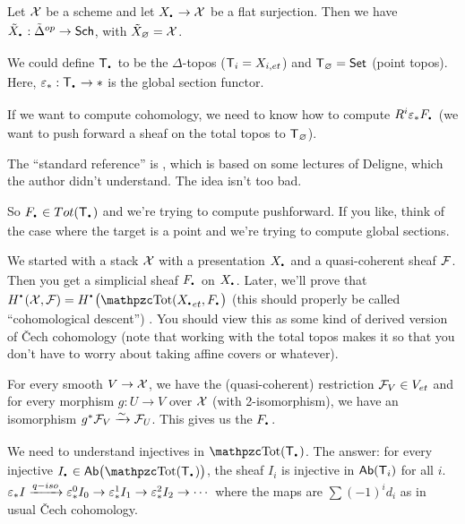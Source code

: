 Let $\mathcal{X}$ be a scheme and let $X_\udot\to \X$ be a flat surjection. Then we have $\tilde X_\udot:\tilde \Delta^{op}\to \sch$, with $\tilde X_\varnothing=\mathcal{X}$.
\begin{example}
  We could define $\T_\udot$ to be the $\Delta$-topos ($\text{\sf T}_i=X_{i,et}$) and $\text{\sf T}_\varnothing=\text{\sf Set}$ (point topos). Here, $\e_*:\T_\udot\to \ast$ is the global section functor. 
\end{example}
If we want to compute cohomology, we need to know how to compute $R^i\e_*F_\udot$ (we want to push forward a sheaf on the total topos to $\text{\sf T}_\varnothing$).

The ``standard reference'' is \cite[4 1/2]{SGA}, which is based on some lectures of Deligne, which the author didn't understand. The idea isn't too bad.

So $F_\udot\in Tot(\T_\udot)$ and we're trying to compute pushforward. If you like, think of the case where the target is a point and we're trying to compute global sections. \begin{remark}[Aside]
  We started with a stack $\mathcal{X}$ with a presentation $X_\udot$ and a quasi-coherent sheaf $\mathcal{F}$. Then you get a simplicial sheaf $F_\udot$ on $X_\udot$. Later, we'll prove that $H^\udot(\X,\F)=H^\udot\bigl(\Tot(X_{\udot et},F_\udot\bigr)$ (this should properly be called ``cohomological descent'') . You should view this as some kind of derived version of \v{C}ech cohomology (note that working with the total topos makes it so that you don't have to worry about taking affine covers or whatever).

  For every smooth $V\to \mathcal{X}$, we have the (quasi-coherent) restriction $\mathcal{F}_V\in V_{et}$ and for every morphism $g:U\to V$ over $\mathcal{X}$ (with 2-isomorphism), we have an isomorphism $g^*\mathcal{F}_V\xrightarrow\sim \mathcal{F}_U$. This gives us the $F_\udot$.
\end{remark}
We need to understand injectives in $\Tot(\T_\udot)$. The answer: for every injective $I_\udot\in \ab\bigl(\Tot(\T_\udot)\bigr)$, the sheaf $I_i$ is injective in $\text{\sf Ab}(\text{\sf T}_i)$ for all $i$. $\varepsilon_*I\xrightarrow{q-iso}\varepsilon_*^0I_0\to \varepsilon_*^1I_1\to \varepsilon_*^2 I_2\to \cdots$ where the maps are $\sum (-1)^i d_i$ as in usual \v{C}ech cohomology.

